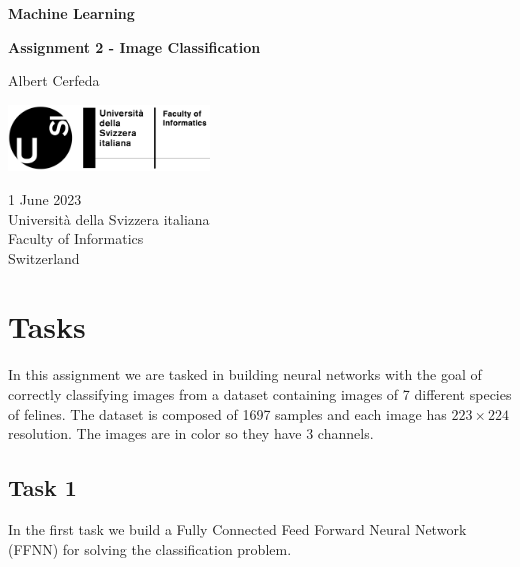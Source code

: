 \documentclass[tikz,14pt,fleqn]{article}
\newcommand\namesurname{Albert Cerfeda}
\newcommand\assignment{Assignment 2 - Image Classification}
\newcommand\subject{Machine Learning}
\newcommand\documentdate{1 June 2023}
\begin{document}
\begin{titlepage}
   \begin{center}
       \vspace*{0.2cm}

       \textbf{\Large{\subject}}

       \vspace{0.5cm}
        \textbf{\assignment}\\[5mm]
        
            
       \vspace{0.4cm}

        \namesurname
        \begin{figure}[H]
            \centering
        \end{figure}
       \tableofcontents

       \vspace*{\fill}
     
        \includegraphics[width=0.4\textwidth]{fig/logo.png}
       
        \documentdate \\
        Università della Svizzera italiana\\
        Faculty of Informatics\\
        Switzerland\\

   \end{center}
\end{titlepage}


\section{Tasks}
In this assignment we are tasked in building neural networks with the goal of correctly classifying images from a dataset containing images of 7 different species of felines. The dataset is composed of 1697 samples and each image has $223\times 224$ resolution. The images are in color so they have 3 channels.

\subsection{Task 1}
In the first task we build a Fully Connected Feed Forward Neural Network (FFNN) for solving the classification problem.
\end{document}
